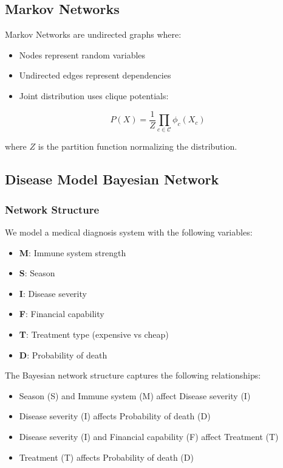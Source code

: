 \documentclass[conference]{IEEEtran}
\begin{document}
\subsection{Markov Networks}

Markov Networks are undirected graphs where:
\begin{itemize}
    \item Nodes represent random variables
    \item Undirected edges represent dependencies
    \item Joint distribution uses clique potentials:
\end{itemize}

\begin{equation}
P(X) = \frac{1}{Z} \prod_{c \in \mathcal{C}} \phi_c(X_c)
\end{equation}

where $Z$ is the partition function normalizing the distribution.

\subsection{Disease Model Bayesian Network}

\subsubsection{Network Structure}

We model a medical diagnosis system with the following variables:
\begin{itemize}
    \item \textbf{M}: Immune system strength
    \item \textbf{S}: Season
    \item \textbf{I}: Disease severity  
    \item \textbf{F}: Financial capability
    \item \textbf{T}: Treatment type (expensive vs cheap)
    \item \textbf{D}: Probability of death
\end{itemize}

The Bayesian network structure captures the following relationships:
\begin{itemize}
    \item Season (S) and Immune system (M) affect Disease severity (I)
    \item Disease severity (I) affects Probability of death (D)
    \item Disease severity (I) and Financial capability (F) affect Treatment (T)
    \item Treatment (T) affects Probability of death (D)
\end{itemize}
\end{document}
